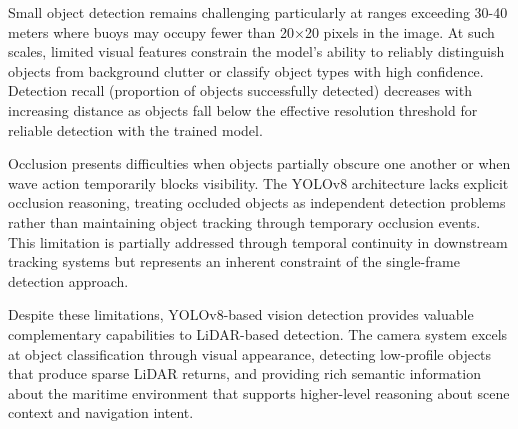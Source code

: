 Small object detection remains challenging particularly at ranges exceeding 30-40 meters where buoys may occupy fewer than 20×20 pixels in the image.
At such scales, limited visual features constrain the model's ability to reliably distinguish objects from background clutter or classify object types with high confidence.
Detection recall (proportion of objects successfully detected) decreases with increasing distance as objects fall below the effective resolution threshold for reliable detection with the trained model.

Occlusion presents difficulties when objects partially obscure one another or when wave action temporarily blocks visibility.
The YOLOv8 architecture lacks explicit occlusion reasoning, treating occluded objects as independent detection problems rather than maintaining object tracking through temporary occlusion events.
This limitation is partially addressed through temporal continuity in downstream tracking systems but represents an inherent constraint of the single-frame detection approach.

Despite these limitations, YOLOv8-based vision detection provides valuable complementary capabilities to \ac{LiDAR}-based detection.
The camera system excels at object classification through visual appearance, detecting low-profile objects that produce sparse \ac{LiDAR} returns, and providing rich semantic information about the maritime environment that supports higher-level reasoning about scene context and navigation intent.

